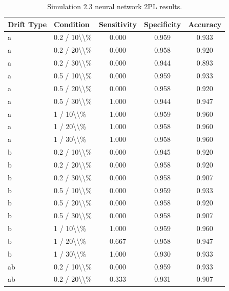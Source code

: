 \begin{table}[!h]
\centering
\caption{\label{tab:tab:sim23_nn_2pl}Simulation 2.3 neural network 2PL results.}
\centering
\begin{tabular}[t]{llccc}
\toprule
Drift Type & Condition & Sensitivity & Specificity & Accuracy\\
\midrule
a & 0.2 / 10\textbackslash{}\textbackslash{}\% & 0.000 & 0.959 & 0.933\\
a & 0.2 / 20\textbackslash{}\textbackslash{}\% & 0.000 & 0.958 & 0.920\\
a & 0.2 / 30\textbackslash{}\textbackslash{}\% & 0.000 & 0.944 & 0.893\\
a & 0.5 / 10\textbackslash{}\textbackslash{}\% & 0.000 & 0.959 & 0.933\\
a & 0.5 / 20\textbackslash{}\textbackslash{}\% & 0.000 & 0.958 & 0.920\\
\addlinespace
a & 0.5 / 30\textbackslash{}\textbackslash{}\% & 1.000 & 0.944 & 0.947\\
a & 1 / 10\textbackslash{}\textbackslash{}\% & 1.000 & 0.959 & 0.960\\
a & 1 / 20\textbackslash{}\textbackslash{}\% & 1.000 & 0.958 & 0.960\\
a & 1 / 30\textbackslash{}\textbackslash{}\% & 1.000 & 0.958 & 0.960\\
b & 0.2 / 10\textbackslash{}\textbackslash{}\% & 0.000 & 0.945 & 0.920\\
\addlinespace
b & 0.2 / 20\textbackslash{}\textbackslash{}\% & 0.000 & 0.958 & 0.920\\
b & 0.2 / 30\textbackslash{}\textbackslash{}\% & 0.000 & 0.958 & 0.907\\
b & 0.5 / 10\textbackslash{}\textbackslash{}\% & 0.000 & 0.959 & 0.933\\
b & 0.5 / 20\textbackslash{}\textbackslash{}\% & 0.000 & 0.958 & 0.920\\
b & 0.5 / 30\textbackslash{}\textbackslash{}\% & 0.000 & 0.958 & 0.907\\
\addlinespace
b & 1 / 10\textbackslash{}\textbackslash{}\% & 1.000 & 0.959 & 0.960\\
b & 1 / 20\textbackslash{}\textbackslash{}\% & 0.667 & 0.958 & 0.947\\
b & 1 / 30\textbackslash{}\textbackslash{}\% & 1.000 & 0.930 & 0.933\\
ab & 0.2 / 10\textbackslash{}\textbackslash{}\% & 0.000 & 0.959 & 0.933\\
ab & 0.2 / 20\textbackslash{}\textbackslash{}\% & 0.333 & 0.931 & 0.907\\

\end{tabular}
\end{table}
